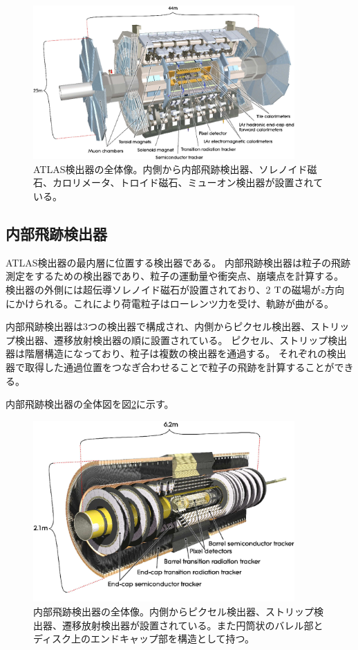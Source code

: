 \begin{figure}[bpt]\centering
\includegraphics[width=10cm]{./atlas_detector.png}
\caption[ATLAS検出器の全体像]{ATLAS検出器の全体像\cite{1-2}。内側から内部飛跡検出器、ソレノイド磁石、カロリメータ、トロイド磁石、ミューオン検出器が設置されている。}
\label{atlas_detector}
\end{figure}


\clearpage
\subsection{内部飛跡検出器}
ATLAS検出器の最内層に位置する検出器である。
内部飛跡検出器は粒子の飛跡測定をするための検出器であり、粒子の運動量や衝突点、崩壊点を計算する。
検出器の外側には超伝導ソレノイド磁石が設置されており、2 $\rm{T}$の磁場が$z$方向にかけられる。これにより荷電粒子はローレンツ力を受け、軌跡が曲がる。

内部飛跡検出器は3つの検出器で構成され、内側からピクセル検出器、ストリップ検出器、遷移放射検出器の順に設置されている。
ピクセル、ストリップ検出器は階層構造になっており、粒子は複数の検出器を通過する。
それぞれの検出器で取得した通過位置をつなぎ合わせることで粒子の飛跡を計算することができる。

内部飛跡検出器の全体図を図\ref{inner_detector}に示す。

\begin{figure}[bpt]\centering
\includegraphics[width=10cm]{./inner_detector.png}
\caption[内部飛跡検出器の全体像]{内部飛跡検出器の全体像\cite{1-2}。内側からピクセル検出器、ストリップ検出器、遷移放射検出器が設置されている。また円筒状のバレル部とディスク上のエンドキャップ部を構造として持つ。}
\label{inner_detector}
\end{figure}


